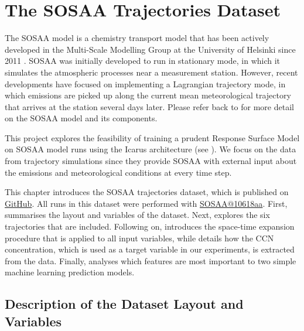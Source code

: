 \chapter{The SOSAA Trajectories Dataset} \label{txt:sosaa-data-chapter}

The SOSAA model is a chemistry transport model that has been actively developed in the Multi-Scale Modelling Group at the University of Helsinki since 2011 \cite{sosa-description-2011}. SOSAA was initially developed to run in stationary mode, in which it simulates the atmospheric processes near a measurement station. However, recent developments have focused on implementing a Lagrangian trajectory mode, in which emissions are picked up along the current mean meteorological trajectory that arrives at the station several days later. Please refer back to  for more detail on the SOSAA model and its components.

This project explores the feasibility of training a prudent Response Surface Model on SOSAA model runs using the Icarus architecture (see ). We focus on the data from trajectory simulations since they provide SOSAA with external input about the emissions and meteorological conditions at every time step.

\newpar This chapter introduces the SOSAA trajectories dataset, which is published on \href{https://github.com/juntyr/sosaa-trajectories-dataset}{GitHub}. All runs in this dataset were performed with \href{https://version.helsinki.fi/putian.zhou/sosaa/-/tree/10618aa98c7470546308adf132afb0bc0735b4eb}{SOSAA@10618aa}. First,  summarises the layout and variables of the dataset. Next,  explores the six trajectories that are included. Following on,  introduces the space-time expansion procedure that is applied to all input variables, while  details how the CCN concentration, which is used as a target variable in our experiments, is extracted from the data. Finally,  analyses which features are most important to two simple machine learning prediction models.

\section{Description of the Dataset Layout and Variables} \label{txt:data-layout-variables}

